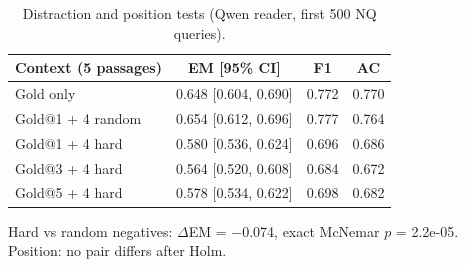 \begin{table}[t]
\centering
\small
\caption{Distraction and position tests (Qwen reader, first 500 NQ queries).}
\label{tab:mechanism}
\begin{tabular}{lccc}
\toprule
Context (5 passages) & EM [95\% CI] & F1 & AC \\
\midrule
Gold only & 0.648 [0.604, 0.690] & 0.772 & 0.770 \\
Gold@1 + 4 random & 0.654 [0.612, 0.696] & 0.777 & 0.764 \\
Gold@1 + 4 hard & 0.580 [0.536, 0.624] & 0.696 & 0.686 \\
Gold@3 + 4 hard & 0.564 [0.520, 0.608] & 0.684 & 0.672 \\
Gold@5 + 4 hard & 0.578 [0.534, 0.622] & 0.698 & 0.682 \\
\bottomrule
\end{tabular}
\par\smallskip\parbox{\linewidth}{\footnotesize Hard vs random negatives: $\Delta$EM = $-$0.074, exact McNemar $p$ = 2.2e-05. Position: no pair differs after Holm.}
\end{table}
